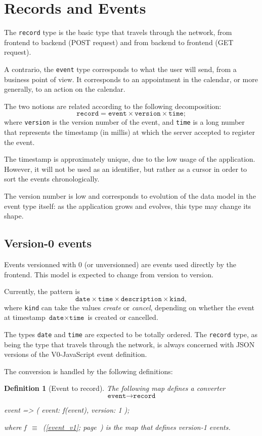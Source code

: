 \documentclass[12pt,a4paper]{report}
\newtheorem{definition}{Definition}
\newcommand{\word}[1]{\texttt{#1}}
\newcommand{\symboldef}[2]{#1\ $\equiv$\ (\ref{#2}; page~\pageref{#2})}
\begin{document}
\section{Records and Events}

The \word{record} type is the basic type that travels through the network,
from frontend to backend (POST request) and from backend to frontend (GET request).

A contrario, the \word{event} type corresponds to what the user will send,
from a business point of view. It corresponds to an appointment in the calendar,
or more generally, to an action on the calendar.

The two notions are related according to the following decomposition:
	\[ \word{record} = \word{event} \times \word{version} \times \word{time} ;\]
where \word{version} is the version number of the event,
and \word{time} is a long number that represents the timestamp (in millis)
at which the server accepted to register the event.

The timestamp is approximately unique, due to the low usage of the application.
However, it will not be used as an identifier, but rather as a cursor
in order to sort the events chronologically.

The version number is low and corresponds to evolution of the data model
in the event type itself: as the application grows and evolves, this
type may change its shape.

\subsection{Version-0 events}

Events versionned with 0 (or unversionned) are events used directly by the
frontend. This model is expected to change from version to version.

Currently, the pattern is
	\[ \word{date} \times \word{time}\times \word{description} \times\word{kind} ,\]
where \word{kind} can take the values \textit{create} or \textit{cancel},
depending on whether the event at timestamp $\word{date}\times\word{time}$
is created or cancelled.

The types \word{date} and \word{time} are expected to be totally
ordered. The \word{record} type, as being the type that travels through the
network, is always concerned with JSON versions of the V0-JavaScript
event definition.

The conversion is handled by the following definitions:
\begin{definition}[Event to record]\label{event_to_record_converter}
The following map defines a converter
	\[ \word{event} \to \word{record} \]
\begin{code}
event => ({
  event: f(event),
  version: 1
});
\end{code}
where \symboldef{f}{event_v1} is the map that defines version-1 events.
\end{definition}
\end{document}
